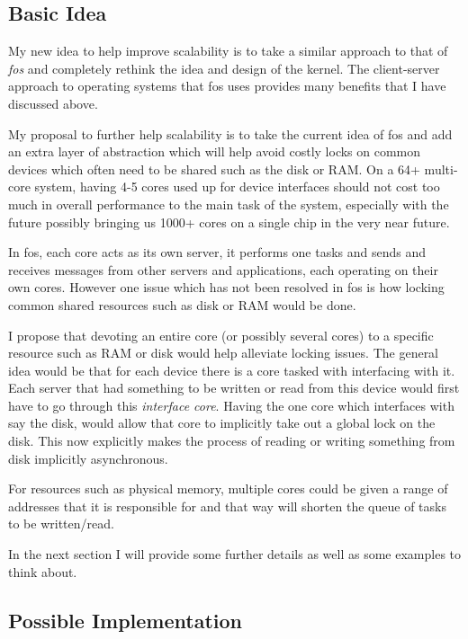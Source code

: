 \documentclass[journal]{IEEEtran}
\begin{document}
\subsection{Basic Idea}
My new idea to help improve scalability is to take a similar approach to that of \emph{fos} \cite{fos} and completely rethink the idea and design of the kernel. The client-server approach to operating systems that fos uses provides many benefits that I have discussed above. 

My proposal to further help scalability is to take the current idea of fos and add an extra layer of abstraction which will help avoid costly locks on common devices which often need to be shared such as the disk or RAM. On a 64+ multi-core system, having 4-5 cores used up for device interfaces should not cost too much in overall performance to the main task of the system, especially with the future possibly bringing us 1000+ cores on a single chip in the very near future. 

In fos, each core acts as its own server, it performs one tasks and sends and receives messages from other servers and applications, each operating on their own cores. However one issue which has not been resolved in fos is how locking common shared resources such as disk or RAM would be done.

I propose that devoting an entire core (or possibly several cores) to a specific resource such as RAM or disk would help alleviate locking issues. The general idea would be that for each device there is a core tasked with interfacing with it. Each server that had something to be written or read from this device would first have to go through this \emph{interface core}. Having the one core which interfaces with say the disk, would allow that core to implicitly take out a global lock on the disk. This now explicitly makes the process of reading or writing something from disk implicitly asynchronous. 

For resources such as physical memory, multiple cores could be given a range of addresses that it is responsible for and that way will shorten the queue of tasks to be written/read.

In the next section I will provide some further details as well as some examples to think about.

\subsection{Possible Implementation}
\end{document}
